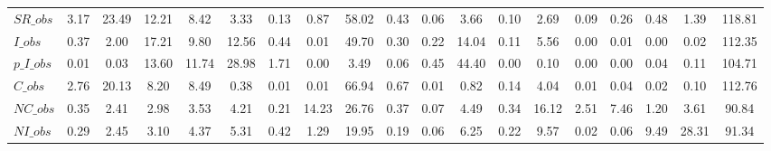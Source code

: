 \begin{center}
\begin{longtable}{lcccccccccccccccccc}
$SR\_obs        $	 & 	                3.17	 & 	               23.49	 & 	               12.21	 & 	                8.42	 & 	                3.33	 & 	                0.13	 & 	                0.87	 & 	               58.02	 & 	                0.43	 & 	                0.06	 & 	                3.66	 & 	                0.10	 & 	                2.69	 & 	                0.09	 & 	                0.26	 & 	                0.48	 & 	                1.39	 & 	              118.81 \\ 
$I\_obs         $	 & 	                0.37	 & 	                2.00	 & 	               17.21	 & 	                9.80	 & 	               12.56	 & 	                0.44	 & 	                0.01	 & 	               49.70	 & 	                0.30	 & 	                0.22	 & 	               14.04	 & 	                0.11	 & 	                5.56	 & 	                0.00	 & 	                0.01	 & 	                0.00	 & 	                0.02	 & 	              112.35 \\ 
$p\_I\_obs      $	 & 	                0.01	 & 	                0.03	 & 	               13.60	 & 	               11.74	 & 	               28.98	 & 	                1.71	 & 	                0.00	 & 	                3.49	 & 	                0.06	 & 	                0.45	 & 	               44.40	 & 	                0.00	 & 	                0.10	 & 	                0.00	 & 	                0.00	 & 	                0.04	 & 	                0.11	 & 	              104.71 \\ 
$C\_obs         $	 & 	                2.76	 & 	               20.13	 & 	                8.20	 & 	                8.49	 & 	                0.38	 & 	                0.01	 & 	                0.01	 & 	               66.94	 & 	                0.67	 & 	                0.01	 & 	                0.82	 & 	                0.14	 & 	                4.04	 & 	                0.01	 & 	                0.04	 & 	                0.02	 & 	                0.10	 & 	              112.76 \\ 
$NC\_obs        $	 & 	                0.35	 & 	                2.41	 & 	                2.98	 & 	                3.53	 & 	                4.21	 & 	                0.21	 & 	               14.23	 & 	               26.76	 & 	                0.37	 & 	                0.07	 & 	                4.49	 & 	                0.34	 & 	               16.12	 & 	                2.51	 & 	                7.46	 & 	                1.20	 & 	                3.61	 & 	               90.84 \\ 
$NI\_obs        $	 & 	                0.29	 & 	                2.45	 & 	                3.10	 & 	                4.37	 & 	                5.31	 & 	                0.42	 & 	                1.29	 & 	               19.95	 & 	                0.19	 & 	                0.06	 & 	                6.25	 & 	                0.22	 & 	                9.57	 & 	                0.02	 & 	                0.06	 & 	                9.49	 & 	               28.31	 & 	               91.34 \\ 

\end{longtable}
\end{center}
